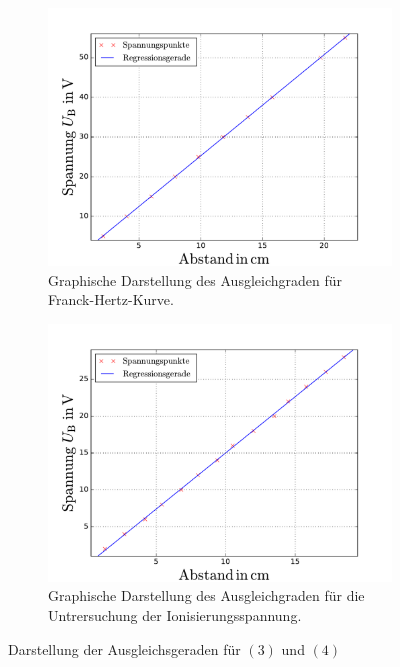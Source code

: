 \begin{figure}
  \centering
  \begin{subfigure}{0.48\textwidth}
    \centering
    \includegraphics[width=1 \textwidth]{../Messdaten/frank_hertz_kuvre.pdf}
    \caption{Graphische Darstellung des Ausgleichgraden für Franck-Hertz-Kurve.}
    \label{fig: frank_hertz}
  \end{subfigure}
  \begin{subfigure}{0.48\textwidth}
    \centering
    \includegraphics[width=1 \textwidth]{../Messdaten/ioni.pdf}
    \caption{Graphische Darstellung des Ausgleichgraden für die Untrersuchung der Ionisierungsspannung.}
    \label{fig: enrgie_hot}
  \end{subfigure}
  \caption{Darstellung der Ausgleichsgeraden für $(3)$ und $(4)$}
  \label{fig: darstellung_2}
\end{figure}

